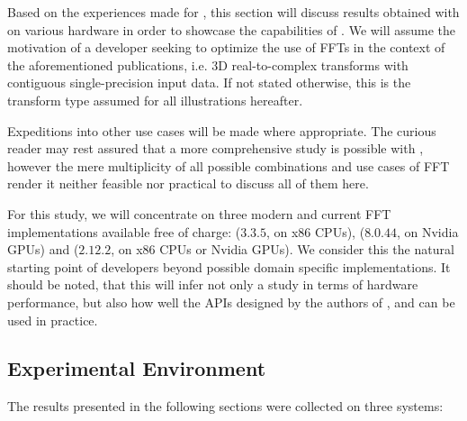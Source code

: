 Based on the experiences made for \cite{preibisch2014efficient, schmid2015real}, this section will discuss results obtained with \gearshifft{} on various hardware in order to showcase the capabilities of \gearshifft{}. We will assume the motivation of a developer seeking to optimize the use of FFTs in the context of the aforementioned publications, i.e. 3D real-to-complex transforms with contiguous single-precision input data. If not stated otherwise, this is the transform type assumed for all illustrations hereafter. 

Expeditions into other use cases will be made where appropriate. The curious reader may rest assured that a more comprehensive study is possible with \gearshifft{}, however the mere multiplicity of all possible combinations and use cases of FFT render it neither feasible nor practical to discuss all of them here.

For this study, we will concentrate on three modern and current FFT implementations available free of charge: \fftw{} ($3.3.5$, on x86 CPUs), \cufft{} ($8.0.44$, on Nvidia GPUs) and \clfft{} ($2.12.2$, on x86 CPUs or Nvidia GPUs). We consider this the natural starting point of developers beyond possible domain specific implementations. It should be noted, that this will infer not only a study in terms of hardware performance, but also how well the APIs designed by the authors of \fftw{}, \clfft{} and \cufft{} can be used in practice. 

\subsection{Experimental Environment}
\label{ssec:env}

The results presented in the following sections were collected on three systems:

